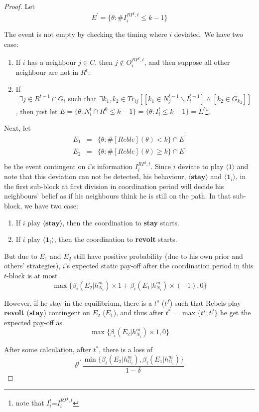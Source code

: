 \documentclass[12pt]{article}
\theoremstyle{remark}
\theoremstyle{remark}
\begin{document}
\begin{proof}


Let
\[E^{'}=\{\theta:\#I^{RP^t,t}_i\leq k-1\}\]

The event is not empty by checking the timing where $i$ deviated. We have two case:
\begin{enumerate}
\item If $i$ has a neighbour $j\in C$, then $j\not\in O^{RP^t,t}_i$, and then suppose all other neighbour are not in $R^t$.
\item If \[\exists j\in R^{t-1}\cap \bar{G}_i \text{ such that } \exists k_1,k_2\in Tr_{ij}[[k_1\in N^{t-1}_j\backslash I^{t-1}_i] \wedge [k_2\in \bar{G}_{k_2}]]\], then just let $E=\{\theta: N^t_i\cap R^0\leq k-1\}=\{\theta: I^t_i\leq k-1\}=E^{'}$\footnote{note that $I^t_i$=$I^{RP^t,t}_i$}.
\end{enumerate}

Next, let 
\begin{eqnarray*}
E_1&=&\{\theta: \#[Reble](\theta)<k\}\cap E^{'}\\
E_2&=&\{\theta: \#[Reble](\theta)\geq k\}\cap E^{'}\\
\end{eqnarray*}
be the event contingent on $i$'s information $I^{RP^t,t}_i$. Since $i$ deviate to play $\langle 1 \rangle$ and note that this deviation can not be detected, his behaviour, $\langle \textbf{stay} \rangle$ and $\langle \mathbf{1}_i \rangle$, in the first sub-block at first division in coordination period will decide his neighbours' belief as if his neighbours think he is still on the path. In that sub-block, we have two case:
\begin{enumerate}
\item If $i$ play $\langle \textbf{stay} \rangle$, then the coordination to \textbf{stay} starts.
\item If $i$ play $\langle \mathbf{1}_i \rangle$, then the coordination to \textbf{revolt} starts.
\end{enumerate}

But due to $E_1$ and $E_2$ still have positive probability (due to his own prior and others' strategies), $i$'s expected static pay-off after the coordination period in this $t$-block is at most 
\[
{\max\{\beta_{i}(E_2|h^{m}_{N_i})\times 1+\beta_{i}(E_1|h^{m}_{N_i})\times (-1), 0\}}
\]

However, if he stay in the equilibrium, there is a $t^s$ ($t^f$) such that Rebels play \textbf{revolt} (\textbf{stay}) contingent on $E_2$ ($E_1$), and thus after $t^*=\max\{t^s,t^f\}$ he get the expected pay-off as
\[
{\max\{\beta_{i}(E_2|h^{m}_{N_i})\times 1, 0\}}
\]

After some calculation, after $t^*$, there is a loss of
\[\delta^{t^{*}}\frac{\min\{\beta_{i}(E_2|h^{m}_{G_i}),\beta_{i}(E_1|h^{m}_{G_i})\}}{1-\delta}\]
 






\end{proof}
\end{document}
